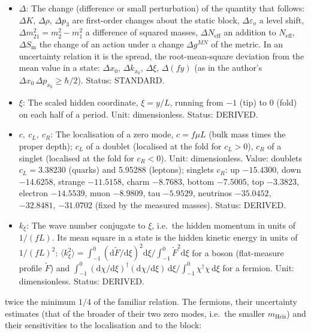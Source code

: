 \documentclass[
  10pt,
]{article}
\providecommand{\tightlist}{%
  \setlength{\itemsep}{0pt}\setlength{\parskip}{0pt}}
\begin{document}
\begin{itemize}
\tightlist
\item
  \(\Delta\): The change (difference or small perturbation) of the
  quantity that follows: \(\Delta K\), \(\Delta\rho\), \(\Delta p_3\)
  are first-order changes about the static block,
  \(\Delta\varepsilon_o\) a level shift,
  \(\Delta m^2_{21} = m_2^2 - m_1^2\) a difference of squared masses,
  \(\Delta N_{\mathrm{eff}}\) an addition to \(N_{\mathrm{eff}}\),
  \(\Delta S_{\mathrm{m}}\) the change of an action under a change
  \(\Delta g^{MN}\) of the metric. In an uncertainty relation it is the
  spread, the root-mean-square deviation from the mean value in a state:
  \(\Delta x_0\), \(\Delta k_{x_0}\), \(\Delta\xi\), \(\Delta(fy)\) (as
  in the author's \(\Delta x_0\,\Delta p_{x_0} \ge \hbar/2\)). Status:
  STANDARD.
\item
  \(\xi\): The scaled hidden coordinate, \(\xi = y/L\), running from
  \(-1\) (tip) to \(0\) (fold) on each half of a period. Unit:
  dimensionless. Status: DERIVED.
\item
  \(c,\ c_L,\ c_R\): The localisation of a zero mode, \(c = f\mu L\)
  (bulk mass times the proper depth); \(c_L\) of a doublet (localised at
  the fold for \(c_L > 0\)), \(c_R\) of a singlet (localised at the fold
  for \(c_R < 0\)). Unit: dimensionless. Value: doublets
  \(c_L = 3.38230\) (quarks) and 5.95288 (leptons); singlets \(c_R\): up
  \(-15.4300\), down \(-14.6258\), strange \(-11.5158\), charm
  \(-8.7683\), bottom \(-7.5005\), top \(-3.3823\), electron
  \(-14.5539\), muon \(-8.9809\), tau \(-5.9529\), neutrinos
  \(-35.0452\), \(-32.8481\), \(-31.0702\) (fixed by the measured
  masses). Status: DERIVED.
\item
  \(k_\xi\): The wave number conjugate to \(\xi\), i.e.~the hidden
  momentum in units of \(1/(fL)\). Its mean square in a state is the
  hidden kinetic energy in units of \(1/(fL)^2\):
  \(\langle k_\xi^2\rangle = \int_{-1}^{0}(\mathrm{d}\tilde F/\mathrm{d}\xi)^2\mathrm{d}\xi\big/\int_{-1}^{0}\tilde F^2\mathrm{d}\xi\)
  for a boson (flat-measure profile \(\tilde F\)) and
  \(\int_{-1}^{0}(\mathrm{d}\chi/\mathrm{d}\xi)^\dagger(\mathrm{d}\chi/\mathrm{d}\xi)\,\mathrm{d}\xi\big/\int_{-1}^{0}\chi^\dagger\chi\,\mathrm{d}\xi\)
  for a fermion. Unit: dimensionless. Status: DERIVED.
\end{itemize}

twice the minimum \(1/4\) of the familiar relation. The fermions, their
uncertainty estimates (that of the broader of their two zero modes,
i.e.~the smaller \(m_{\mathrm{Heis}}\)) and their sensitivities to the
localisation and to the block:
\end{document}
